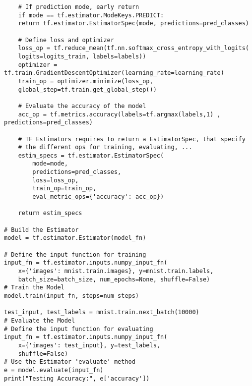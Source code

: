 \begin{verbatim}
	# If prediction mode, early return
	if mode == tf.estimator.ModeKeys.PREDICT:
	return tf.estimator.EstimatorSpec(mode, predictions=pred_classes)

	# Define loss and optimizer
	loss_op = tf.reduce_mean(tf.nn.softmax_cross_entropy_with_logits(
	logits=logits_train, labels=labels))
	optimizer = tf.train.GradientDescentOptimizer(learning_rate=learning_rate)
	train_op = optimizer.minimize(loss_op,
	global_step=tf.train.get_global_step())

	# Evaluate the accuracy of the model
	acc_op = tf.metrics.accuracy(labels=tf.argmax(labels,1) , predictions=pred_classes)

	# TF Estimators requires to return a EstimatorSpec, that specify
	# the different ops for training, evaluating, ...
	estim_specs = tf.estimator.EstimatorSpec(
		mode=mode,
		predictions=pred_classes,
		loss=loss_op,
		train_op=train_op,
		eval_metric_ops={'accuracy': acc_op})

	return estim_specs

# Build the Estimator
model = tf.estimator.Estimator(model_fn)

# Define the input function for training
input_fn = tf.estimator.inputs.numpy_input_fn(
	x={'images': mnist.train.images}, y=mnist.train.labels,
	batch_size=batch_size, num_epochs=None, shuffle=False)
# Train the Model
model.train(input_fn, steps=num_steps)

test_input, test_labels = mnist.train.next_batch(10000)
# Evaluate the Model
# Define the input function for evaluating
input_fn = tf.estimator.inputs.numpy_input_fn(
	x={'images': test_input}, y=test_labels,
	shuffle=False)
# Use the Estimator 'evaluate' method
e = model.evaluate(input_fn)
print("Testing Accuracy:", e['accuracy'])
\end{verbatim}